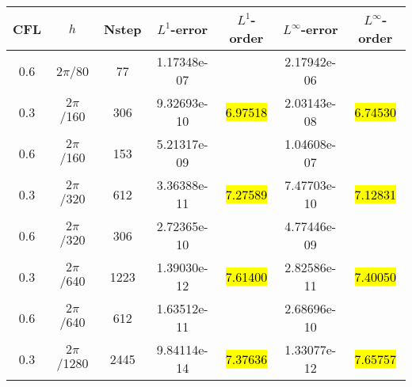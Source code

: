 \def\titleintable{CFL&$h$&Nstep&$L^1$-error&$L^1$-order&$L^\infty$-error&$L^\infty$-order\\}

\begin{table}[htbp]
	\label{ta:1D-ex3-WHC8}
	\centering
	\begin{tabular}{ccccccc}
		\toprule
		\titleintable
		\midrule
		0.6 & $2\pi$/80   & 77   & 1.17348e-07 &              & 2.17942e-06 &              \\
		0.3 & $2\pi$/160  & 306  & 9.32693e-10 & \hl{6.97518} & 2.03143e-08 & \hl{6.74530} \\
		\midrule
		0.6 & $2\pi$/160  & 153  & 5.21317e-09 &              & 1.04608e-07 &              \\
		0.3 & $2\pi$/320  & 612  & 3.36388e-11 & \hl{7.27589} & 7.47703e-10 & \hl{7.12831} \\
		\midrule
		0.6 & $2\pi$/320  & 306  & 2.72365e-10 &              & 4.77446e-09 &              \\
		0.3 & $2\pi$/640  & 1223 & 1.39030e-12 & \hl{7.61400} & 2.82586e-11 & \hl{7.40050} \\
		\midrule
		0.6 & $2\pi$/640  & 612  & 1.63512e-11 &              & 2.68696e-10 &              \\
		0.3 & $2\pi$/1280 & 2445 & 9.84114e-14 & \hl{7.37636} & 1.33077e-12 & \hl{7.65757} \\
		\bottomrule
	\end{tabular}
\end{table}

